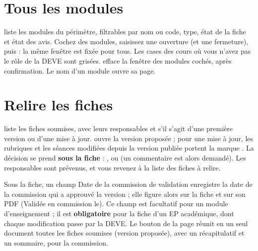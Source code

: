 \documentclass[11pt,a4paper]{article}
\begin{document}

\section{Tous les modules}

 liste les modules du périmètre, filtrables par nom ou code, type,
état de la fiche et état des avis. Cochez des modules, saisissez une ouverture (et une
fermeture), puis  : la même fenêtre est fixée pour tous. Les cases des cours
où vous n'avez pas le rôle de la DEVE sont grisées.  efface la
fenêtre des modules cochés, après confirmation. Le nom d'un module ouvre sa page.


\section{Relire les fiches}

 liste les fiches soumises, avec leurs responsables et s'il s'agit
d'une première version ou d'une mise à jour.  ouvre la version proposée ; pour
une mise à jour, les rubriques et les séances modifiées depuis la version publiée portent la
marque . La décision se prend \textbf{sous la fiche} : ,
 ou  (un commentaire est alors demandé). Les
responsables sont prévenus, et vous revenez à la liste des fiches à relire.




Sous la fiche, un champ \og Date de la commission de validation\fg{} enregistre la date de la
commission qui a approuvé la version ; elle figure alors sur la fiche et sur son PDF
(\og Validée en commission le\fg{}). Ce champ est facultatif pour un module d'enseignement ; il
est \textbf{obligatoire} pour la fiche d'un EP académique, dont chaque modification passe par
la DEVE. Le bouton  de la page  réunit
en un seul document toutes les fiches soumises (version proposée), avec un récapitulatif et un
sommaire, pour la commission.
\end{document}
